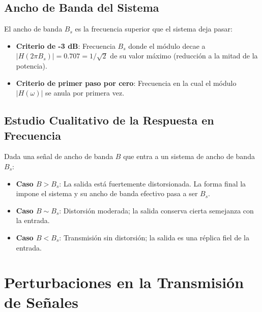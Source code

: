 \subsection{Ancho de Banda del Sistema}
El ancho de banda $B_s$ es la frecuencia superior que el sistema deja pasar:
\begin{itemize}[leftmargin=*]
    \item \textbf{Criterio de -3 dB}: Frecuencia $B_s$ donde el módulo decae a $|H(2\pi B_s)| = 0.707 = 1/\sqrt{2}$ de su valor máximo (reducción a la mitad de la potencia).
    \item \textbf{Criterio de primer paso por cero}: Frecuencia en la cual el módulo $|H(\omega)|$ se anula por primera vez.
\end{itemize}

\subsection{Estudio Cualitativo de la Respuesta en Frecuencia}
Dada una señal de ancho de banda $B$ que entra a un sistema de ancho de banda $B_s$:
\begin{itemize}[leftmargin=*]
    \item \textbf{Caso $B > B_s$}: La salida está fuertemente distorsionada. La forma final la impone el sistema y su ancho de banda efectivo pasa a ser $B_s$.
    \item \textbf{Caso $B \sim B_s$}: Distorsión moderada; la salida conserva cierta semejanza con la entrada.
    \item \textbf{Caso $B < B_s$}: Transmisión sin distorsión; la salida es una réplica fiel de la entrada.
\end{itemize}

\section{Perturbaciones en la Transmisión de Señales}

